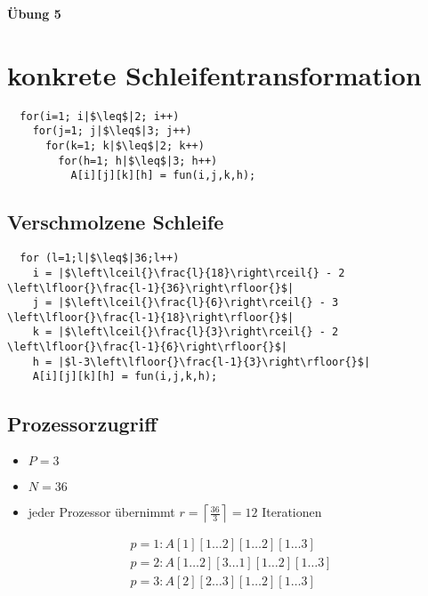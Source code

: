 \documentclass{article}
\begin{document}
{\LARGE\textbf{Übung 5}}

\section{konkrete Schleifentransformation}
\begin{verbatim}
  for(i=1; i|$\leq$|2; i++)
    for(j=1; j|$\leq$|3; j++)
      for(k=1; k|$\leq$|2; k++)
        for(h=1; h|$\leq$|3; h++)
          A[i][j][k][h] = fun(i,j,k,h);
\end{verbatim}

\subsection{Verschmolzene Schleife}
\begin{verbatim}
  for (l=1;l|$\leq$|36;l++)
    i = |$\left\lceil{}\frac{l}{18}\right\rceil{} - 2 \left\lfloor{}\frac{l-1}{36}\right\rfloor{}$|
    j = |$\left\lceil{}\frac{l}{6}\right\rceil{} - 3 \left\lfloor{}\frac{l-1}{18}\right\rfloor{}$|
    k = |$\left\lceil{}\frac{l}{3}\right\rceil{} - 2 \left\lfloor{}\frac{l-1}{6}\right\rfloor{}$|
    h = |$l-3\left\lfloor{}\frac{l-1}{3}\right\rfloor{}$|
    A[i][j][k][h] = fun(i,j,k,h);
\end{verbatim}

\subsection{Prozessorzugriff}
\begin{itemize}
  \item $P=3$
  \item $N=36$
  \item jeder Prozessor übernimmt $r=\left\lceil{}\frac{36}{3}\right\rceil{} = 12$ Iterationen
\end{itemize}
\begin{align}
  p=1: A[1][1\dots2][1\dots2][1\dots3] \\
  p=2: A[1\dots2][3\dots1][1\dots2][1\dots3] \\
  p=3: A[2][2\dots3][1\dots2][1\dots3] \\
\end{align}
\end{document}
